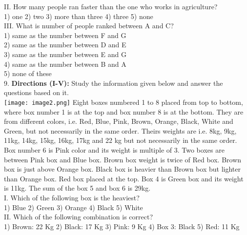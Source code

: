 \documentclass[
]{article}
\begin{document}
II. How many people ran faster than the one who works in agriculture?\\
1) one \hspace{2mm}2) two
\hspace{2mm}3) more than three \hspace{2mm}4) three \hspace{2mm}5) none\\

III. What is number of people ranked between A and C?\\
1) same as the number between F and G\\
2) same as the number between D and E\\
3) same as the number between E and G\\
4) same as the number between B and A\\
5) none of these\\

9. \textbf{Directions (I-V):} Study the information given below and answer the questions based on it.\\
\texttt{[image: image2.png]}
Eight boxes numbered 1 to 8 placed from top to bottom, where box number 1 is at the top and
box number 8 is at the bottom. They are from different colors, i.e. Red, Blue, Pink, Brown,
Orange, Black, White and Green, but not necessarily in the same order. Theirs weights are i.e.
8kg, 9kg, 11kg, 14kg, 15kg, 16kg, 17kg and 22 kg but not necessarily in the same order. Box
number 6 is Pink color and its weight is multiple of 3. Two boxes are between Pink box and
Blue box. Brown box weight is twice of Red box. Brown box is just above Orange box. Black
box is heavier than Brown box but lighter than Orange box. Red box placed at the top. Box 4
is Green box and its weight is 11kg. The sum of the box 5 and box 6 is 29kg.\\

I. Which of the following box is the heaviest?\\
1) Blue \hspace{2mm}2) Green \hspace{2mm}3) Orange \hspace{2mm}4) Black \hspace{2mm}5) White\\

II. Which of the following combination is correct?\\
1) Brown: 22 Kg \hspace{2mm}2) Black: 17 Kg \hspace{2mm}3) Pink: 9 Kg
\hspace{2mm}4) Box 3: Black \hspace{2mm}5) Red: 11 Kg\\
\end{document}
